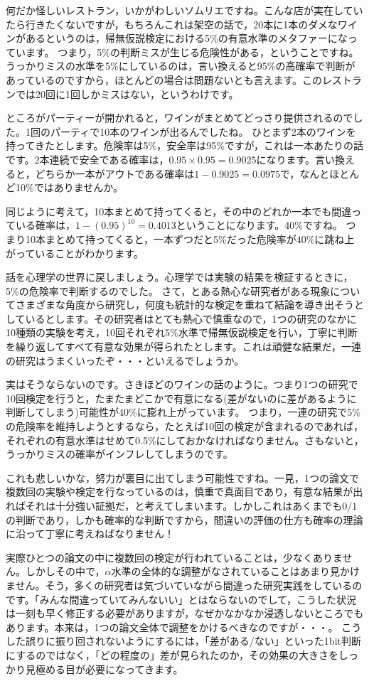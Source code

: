 \documentclass{ltjsbook}
\begin{document}
何だか怪しいレストラン，いかがわしいソムリエですね。こんな店が実在していたら行きたくないですが，もちろんこれは架空の話で，20本に1本のダメなワインがあるというのは，帰無仮説検定における5\%の有意水準のメタファーになっています。
つまり，5\%の判断ミスが生じる危険性がある，ということですね。
うっかりミスの水準を5\%にしているのは，言い換えると95\%の高確率で判断があっているのですから，ほとんどの場合は問題ないとも言えます。このレストランでは20回に1回しかミスはない，というわけです。

ところがパーティーが開かれると，ワインがまとめてどっさり提供されるのでした。1回のパーティで10本のワインが出るんでしたね。
ひとまず2本のワインを持ってきたとします。危険率は5\%，安全率は95\%ですが，これは一本あたりの話です。2本連続で安全である確率は，$0.95\times 0.95=0.9025$になります。言い換えると，どちらか一本がアウトである確率は$1-0.9025=0.0975$で，なんとほとんど10\%ではありませんか。

同じように考えて，10本まとめて持ってくると，その中のどれか一本でも間違っている確率は，$1-(0.95)^{10}=0.4013$ということになります。40\%ですね。
つまり10本まとめて持ってくると，一本ずつだと5\%だった危険率が40\%に跳ね上がっていることがわかります。

話を心理学の世界に戻しましょう。心理学では実験の結果を検証するときに，5\%の危険率で判断するのでした。
さて，とある熱心な研究者がある現象についてさまざまな角度から研究し，何度も統計的な検定を重ねて結論を導き出そうとしているとします。その研究者はとても熱心で慎重なので，1つの研究のなかに10種類の実験を考え，10回それぞれ5\%水準で帰無仮説検定を行い，丁寧に判断を繰り返してすべて有意な効果が得られたとします。これは頑健な結果だ，一連の研究はうまくいったぞ・・・といえるでしょうか。

実はそうならないのです。さきほどのワインの話のように。つまり1つの研究で10回検定を行うと，たまたまどこかで有意になる(差がないのに差があるように判断してしまう)可能性が40\%に膨れ上がっています。
つまり，一連の研究で5\%の危険率を維持しようとするなら，たとえば10回の検定が含まれるのであれば，それぞれの有意水準はせめて0.5\%にしておかなければなりません。さもないと，うっかりミスの確率がインフレしてしまうのです。

これも悲しいかな，努力が裏目に出てしまう可能性ですね。一見，1つの論文で複数回の実験や検定を行なっているのは，慎重で真面目であり，有意な結果が出ればそれは十分強い証拠だ，と考えてしまいます。しかしこれはあくまでも0/1の判断であり，しかも確率的な判断ですから，間違いの評価の仕方も確率の理論に沿って丁寧に考えねばなりません！

実際ひとつの論文の中に複数回の検定が行われていることは，少なくありません。しかしその中で，$\alpha$水準の全体的な調整がなされていることはあまり見かけません。そう，多くの研究者は気づいていながら間違った研究実践をしているのです。「みんな間違っていてみんないい」とはならないのでして，こうした状況は一刻も早く修正する必要がありますが，なぜかなかなか浸透しないところでもあります。本来は，1つの論文全体で調整をかけるべきなのですが・・・。
こうした誤りに振り回されないようにするには，「差がある/ない」といった1bit判断にするのではなく，「どの程度の」差が見られたのか，その効果の大きさをしっかり見極める目が必要になってきます。
\end{document}
